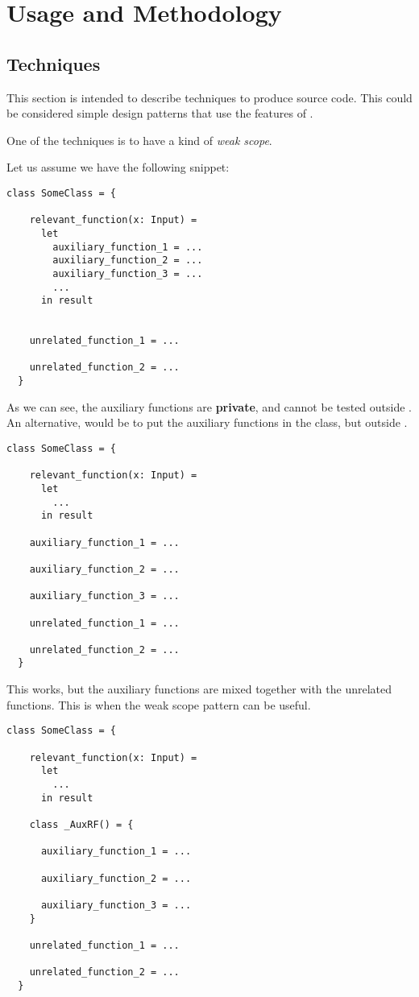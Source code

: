 \chapter{Usage and Methodology}


\section{Techniques}

This section is intended to describe techniques to produce \Soda source code.
This could be considered simple design patterns that use the features of \Soda.

One of the techniques is to have a kind of \textit{weak scope}.

Let us assume we have the following snippet:
\begin{lstlisting}[label={lst:techniquesWeakScope0}]
  class SomeClass = {

    relevant_function(x: Input) =
      let
        auxiliary_function_1 = ...
        auxiliary_function_2 = ...
        auxiliary_function_3 = ...
        ...
      in result


    unrelated_function_1 = ...

    unrelated_function_2 = ...
  }
\end{lstlisting}

As we can see, the auxiliary functions are \textbf{private}, and cannot be tested outside .
An alternative, would be to put the auxiliary functions in the class, but outside .

\begin{lstlisting}[label={lst:techniquesWeakScope1}]
  class SomeClass = {

    relevant_function(x: Input) =
      let
        ...
      in result

    auxiliary_function_1 = ...

    auxiliary_function_2 = ...

    auxiliary_function_3 = ...

    unrelated_function_1 = ...

    unrelated_function_2 = ...
  }
\end{lstlisting}

This works, but the auxiliary functions are mixed together with the unrelated functions.
This is when the weak scope pattern can be useful.

\begin{lstlisting}[label={lst:techniquesWeakScope2}]
  class SomeClass = {

    relevant_function(x: Input) =
      let
        ...
      in result

    class _AuxRF() = {

      auxiliary_function_1 = ...

      auxiliary_function_2 = ...

      auxiliary_function_3 = ...
    }

    unrelated_function_1 = ...

    unrelated_function_2 = ...
  }
\end{lstlisting}

